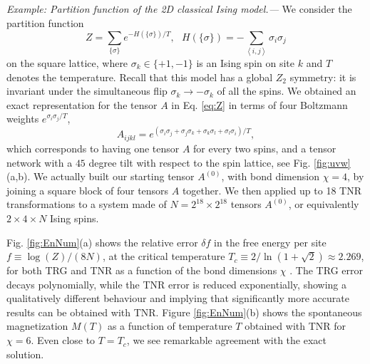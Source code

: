 \documentclass[aps,prl,twocolumn,showpacs,superscriptaddress,floatfix,10pt]{revtex4-1}
\begin{document}
\textit{Example: Partition function of the 2D classical Ising model.---} We consider the partition function
\begin{equation} \label{eq:Ising}
Z = \sum_{\{\sigma\}} e^{-H(\{\sigma\})/T}, ~~~H\left( \{ \sigma \} \right) =  - \sum_{\left\langle i,j \right\rangle}  \sigma _i\sigma _j
\end{equation}
on the square lattice, where $\sigma_k \in \{+1,-1\}$ is an Ising spin on site $k$ and $T$ denotes the temperature. Recall that this model has a global $Z_2$ symmetry: it is invariant under the simultaneous flip $\sigma_k \rightarrow -\sigma_k$ of all the spins. 
We obtained an exact representation for the tensor $A$ in Eq. \ref{eq:Z} in terms of four Boltzmann weights $e^{\sigma_i\sigma_j/T}$,
\begin{equation} \label{eq:A}
A_{ijkl} = e^{\left(\sigma_i\sigma_j + \sigma_j\sigma_k + \sigma_k\sigma_l + \sigma_l\sigma_i \right)/T},
\end{equation}
which corresponds to having one tensor $A$ for every two spins, and a tensor network with a $45$ degree tilt with respect to the spin lattice, see Fig. \ref{fig:uvw}(a,b). We actually built our starting tensor $A^{(0)}$, with bond dimension $\chi=4$, by joining a square block of four tensors $A$ together. We then applied up to 18 TNR transformations to a system made of $N = 2^{18} \times 2^{18}$ tensors $A^{(0)}$, or equivalently $2\times 4 \times N$ Ising spins.

Fig. \ref{fig:EnNum}(a) shows the relative error $\delta f$ in the free energy per site $f \equiv \log(Z)/(8N)$, at the critical temperature $T_c \equiv 2/\ln(1+\sqrt{2}) \approx 2.269$, for both TRG and TNR as a function of the bond dimensions $\chi$ \cite{chiexplain}. The TRG error decays polynomially, while the TNR error is reduced exponentially, showing a qualitatively different behaviour and implying that significantly more accurate results can be obtained with TNR. Figure \ref{fig:EnNum}(b) shows the spontaneous magnetization $M(T)$ as a function of temperature $T$ obtained with TNR for $\chi=6$. Even close to $T=T_c$, we see remarkable agreement with the exact solution. 
 
\end{document}
